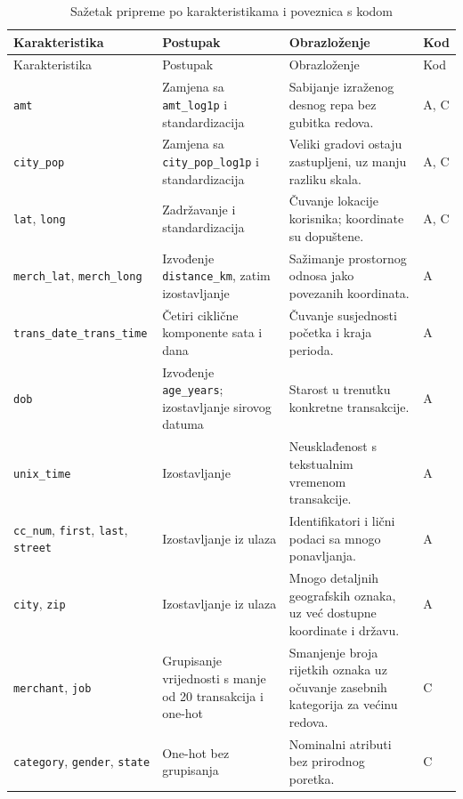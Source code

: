 \begingroup\small\setlength{\tabcolsep}{3pt}
\begin{longtable}{@{}>{\raggedright\arraybackslash}p{.21\linewidth}>{\raggedright\arraybackslash}p{.27\linewidth}>{\raggedright\arraybackslash}p{.33\linewidth}>{\raggedright\arraybackslash}p{.10\linewidth}@{}}
\caption{Sažetak pripreme po karakteristikama i poveznica s kodom}\label{tab:priprema-po-atributima}\\
\toprule Karakteristika & Postupak & Obrazloženje & Kod \\ \midrule\endfirsthead
\toprule Karakteristika & Postupak & Obrazloženje & Kod \\ \midrule\endhead
\bottomrule\endfoot
\texttt{amt} & Zamjena sa \texttt{amt\_log1p} i standardizacija & Sabijanje izraženog desnog repa bez gubitka redova. & A, C \\
\texttt{city\_pop} & Zamjena sa \texttt{city\_pop\_log1p} i standardizacija & Veliki gradovi ostaju zastupljeni, uz manju razliku skala. & A, C \\
\texttt{lat}, \texttt{long} & Zadržavanje i standardizacija & Čuvanje lokacije korisnika; koordinate su dopuštene. & A, C \\
\texttt{merch\_lat}, \texttt{merch\_long} & Izvođenje \texttt{distance\_km}, zatim izostavljanje & Sažimanje prostornog odnosa jako povezanih koordinata. & A \\
\texttt{trans\_date\_}\newline\texttt{trans\_time} & Četiri ciklične komponente sata i dana & Čuvanje susjednosti početka i kraja perioda. & A \\
\texttt{dob} & Izvođenje \texttt{age\_years}; izostavljanje sirovog datuma & Starost u trenutku konkretne transakcije. & A \\
\texttt{unix\_time} & Izostavljanje & Neusklađenost s tekstualnim vremenom transakcije. & A \\
\texttt{cc\_num}, \texttt{first}, \texttt{last}, \texttt{street} & Izostavljanje iz ulaza & Identifikatori i lični podaci sa mnogo ponavljanja. & A \\
\texttt{city}, \texttt{zip} & Izostavljanje iz ulaza & Mnogo detaljnih geografskih oznaka, uz već dostupne koordinate i državu. & A \\
\texttt{merchant}, \texttt{job} & Grupisanje vrijednosti s manje od 20 transakcija i one-hot & Smanjenje broja rijetkih oznaka uz očuvanje zasebnih kategorija za većinu redova. & C \\
\texttt{category}, \texttt{gender}, \texttt{state} & One-hot bez grupisanja & Nominalni atributi bez prirodnog poretka. & C \\

\end{longtable}
